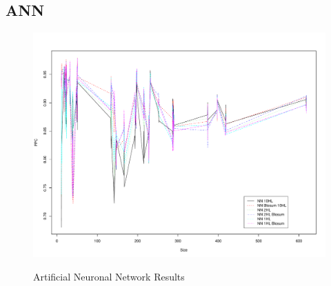 \subsection*{ANN}

\begin{figure}
\begin{center}
\includegraphics[width=12cm]{fig/ann1.pdf}
\label{fig:ann1}
\caption{Artificial Neuronal Network Results}
\end{center}
\end{figure}

